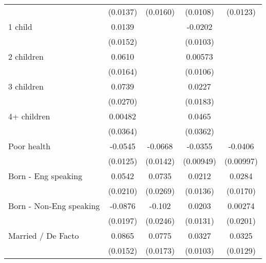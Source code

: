 {\begin{tabular}{l*{4}{c}}
                    &    (0.0137)         &    (0.0160)         &    (0.0108)         &    (0.0123)         \\
[1em]
1 child             &      0.0139         &                     &     -0.0202\sym{*}  &                     \\
                    &    (0.0152)         &                     &    (0.0103)         &                     \\
[1em]
2 children          &      0.0610\sym{***}&                     &     0.00573         &                     \\
                    &    (0.0164)         &                     &    (0.0106)         &                     \\
[1em]
3 children          &      0.0739\sym{**} &                     &      0.0227         &                     \\
                    &    (0.0270)         &                     &    (0.0183)         &                     \\
[1em]
4+ children         &     0.00482         &                     &      0.0465         &                     \\
                    &    (0.0364)         &                     &    (0.0362)         &                     \\
[1em]
Poor health         &     -0.0545\sym{***}&     -0.0668\sym{***}&     -0.0355\sym{***}&     -0.0406\sym{***}\\
                    &    (0.0125)         &    (0.0142)         &   (0.00949)         &   (0.00997)         \\
[1em]
Born - Eng speaking &      0.0542\sym{**} &      0.0735\sym{**} &      0.0212         &      0.0284         \\
                    &    (0.0210)         &    (0.0269)         &    (0.0136)         &    (0.0170)         \\
[1em]
Born - Non-Eng speaking&     -0.0876\sym{***}&      -0.102\sym{***}&      0.0203         &     0.00274         \\
                    &    (0.0197)         &    (0.0246)         &    (0.0131)         &    (0.0201)         \\
[1em]
Married / De Facto  &      0.0865\sym{***}&      0.0775\sym{***}&      0.0327\sym{**} &      0.0325\sym{*}  \\
                    &    (0.0152)         &    (0.0173)         &    (0.0103)         &    (0.0129)         \\

\end{tabular}}
